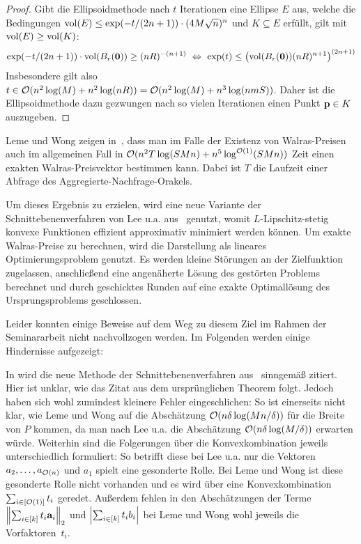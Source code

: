 \begin{proof}
	Gibt die Ellipsoidmethode nach $t$ Iterationen eine Ellipse $E$ aus, welche die Bedingungen $\operatorname{vol}(E) \leq \exp(-t / ({2n + 1}))\cdot (4M \sqrt{n})^n$ und $K\subseteq E$ erfüllt, gilt mit $\operatorname{vol}(E) \geq \operatorname{vol}(K)$:
	\[ \exp(-t / ({2n + 1}))\cdot \operatorname{vol}(B_r(\mathbf{0})) \geq (nR)^{-(n+1)}
	~ \Leftrightarrow ~ \exp(t) \leq \left( \operatorname{vol}(B_r(\mathbf{0}))  (nR)^{n+1} \right)^{(2n+1)} \]
	Insbesondere gilt also $t\in\mathcal{O}(n^2\log(M) + n^2\log(nR)) = \mathcal{O}(n^2\log(M) + n^3 \log(n m S))$.
	Daher ist die Ellipsoidmethode dazu gezwungen nach so vielen Iterationen einen Punkt $\mathbf{p}\in K$ auszugeben.
\end{proof}

Leme und Wong zeigen in~\cite[Theorem~7]{PaesLeme2018}, dass man im Falle der Existenz von Walras-Preisen auch im allgemeinen Fall in $\mathcal{O}(n^2 T \log(SMn) + n^5\log^{\mathcal{O}(1)}(SMn))$ Zeit einen exakten Walras-Preisvektor bestimmen kann.
Dabei ist $T$ die Laufzeit einer Abfrage des Aggregierte-Nachfrage-Orakels.

Um dieses Ergebnis zu erzielen, wird eine neue Variante der Schnittebenenverfahren von Lee u.a. aus~\cite[Theorem~31]{Lee} genutzt,
womit $L$-Lipschitz-stetig konvexe Funktionen effizient approximativ minimiert werden können.
Um exakte Walras-Preise zu berechnen, wird die Darstellung als lineares Optimierungsproblem genutzt.
Es werden kleine Störungen an der Zielfunktion zugelassen, anschließend eine angenäherte Lösung des gestörten Problems berechnet und durch geschicktes Runden
auf eine exakte Optimallösung des Ursprungsproblems geschlossen.

Leider konnten einige Beweise auf dem Weg zu diesem Ziel im Rahmen der Seminararbeit nicht nachvollzogen werden.
Im Folgenden werden einige Hindernisse aufgezeigt:

In \cite[Theorem~5]{PaesLeme2018} wird die neue Methode der Schnittebenenverfahren aus~\cite[Theorem~31]{Lee} sinngemäß zitiert.
Hier ist unklar, wie das Zitat aus dem ursprünglichen Theorem folgt.
Jedoch haben sich wohl zumindest kleinere Fehler eingeschlichen:
So ist einerseits nicht klar, wie Leme und Wong auf die Abschätzung $\mathcal{O}(n\delta \log(Mn/\delta))$ für die Breite von $P$ kommen, da man nach Lee u.a. die Abschätzung $\mathcal{O}(n\delta \log(M/\delta))$ erwarten würde.
Weiterhin sind die Folgerungen über die Konvexkombination jeweils unterschiedlich formuliert:
So betrifft diese bei Lee u.a. nur die Vektoren $a_2,\dots, a_{\mathcal{O}(n)}$ und $a_1$ spielt eine gesonderte Rolle.
Bei Leme und Wong ist diese gesonderte Rolle nicht vorhanden und es wird über eine Konvexkombination $\sum_{i\in[\mathcal{O}(1)]} t_i$ geredet.
Außerdem fehlen in den Abschätzungen der Terme $\left\lVert \sum_{i\in\left[ k \right]} t_i\mathbf{a}_i \right\rVert_2$ und $\left\lvert \sum_{i\in\left[ k \right]} t_i b_i \right\rvert$ bei Leme und Wong wohl jeweils die Vorfaktoren~$t_i$.

